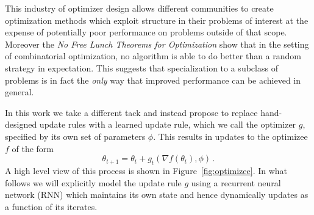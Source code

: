 This industry of optimizer design allows different communities to create
optimization methods which exploit structure in their problems of interest at
the expense of potentially poor performance on problems outside of that scope.
Moreover the \emph{No Free Lunch Theorems for Optimization}
\citep{wolpert:1997} show that in the setting of combinatorial optimization, no
algorithm is able to do better than a random strategy in expectation.  This
suggests that specialization to a subclass of problems is in fact the
\emph{only} way that improved performance can be achieved in general.



In this work we take a different tack and instead propose to replace hand-designed update rules with a learned update rule, which we call the optimizer
$g$, specified by its own set of parameters $\phi$. This results in updates to
the optimizee $f$ of the form
\begin{equation}
  \theta_{t+1} = \theta_t + g_t(\nabla f(\theta_t), \phi)
  \,.
  \label{eq:meta-update}
\end{equation}
A high level view of this process is shown in Figure~\ref{fig:optimizee}.  In
what follows we will explicitly model the update rule $g$ using a recurrent
neural network (RNN) which maintains its own state and hence dynamically
updates as a function of its iterates.




